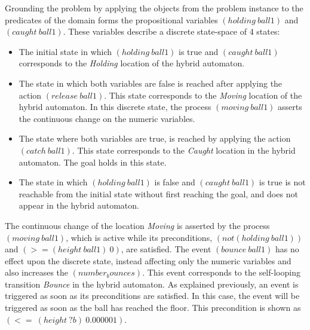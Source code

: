 Grounding the problem by applying the objects from the problem instance to the predicates of the domain forms the propositional variables $(holding\ ball1)$ and $(caught\ ball1)$. These variables describe a discrete state-space of 4 states:
\begin{itemize}
\item The initial state in which $(holding\ ball1)$ is true and $(caught\ ball1)$ corresponds to the \emph{Holding} location of the hybrid automaton.
\item The state in which both variables are false is reached after applying the action $(release\ ball1)$. This state corresponds to the \emph{Moving} location of the hybrid automaton. In this discrete state, the process $(moving\ ball1)$ asserts the continuous change on the numeric variables.
\item The state where both variables are true, is reached by applying the action $(catch\ ball1)$. This state corresponds to the \emph{Caught} location in the hybrid automaton. The goal holds in this state.
\item The state in which $(holding\ ball1)$ is false and $(caught\ ball1)$ is true is not reachable from the initial state without first reaching the goal, and does not appear in the hybrid automaton.
\end{itemize}

The continuous change of the location \emph{Moving} is asserted by the process $(moving\ ball1)$, which is active while its preconditions, $(not (holding\ ball1))$ and $(>= (height\ ball1)\ 0)$, are satisfied. The event $(bounce\ ball1)$ has no effect upon the discrete state, instead affecting only the numeric variables and also increases the $(number_bounces)$. This event corresponds to the self-looping transition \textit{Bounce} in the hybrid automaton. As explained previously, an event is triggered as soon as its preconditions are satisfied. In this case, the event will be triggered as soon as the ball has reached the floor. This precondition is shown as $(<= \ (height \  ?b) \ 0.000001)$.
